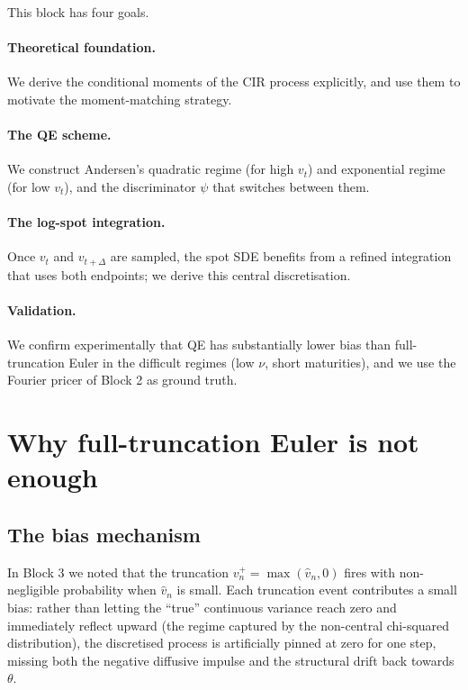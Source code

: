 \documentclass[11pt]{article}
\theoremstyle{plain}
\theoremstyle{definition}
\theoremstyle{remark}
\begin{document}
This block has four goals.

\paragraph{Theoretical foundation.} We derive the conditional moments of the CIR process explicitly, and use them to motivate the moment-matching strategy.

\paragraph{The QE scheme.} We construct Andersen's quadratic regime (for high $v_t$) and exponential regime (for low $v_t$), and the discriminator $\psi$ that switches between them.

\paragraph{The log-spot integration.} Once $v_t$ and $v_{t+\Delta}$ are sampled, the spot SDE benefits from a refined integration that uses both endpoints; we derive this central discretisation.

\paragraph{Validation.} We confirm experimentally that QE has substantially lower bias than full-truncation Euler in the difficult regimes (low $\nu$, short maturities), and we use the Fourier pricer of Block 2 as ground truth.

\section{Why full-truncation Euler is not enough}

\subsection{The bias mechanism}

In Block 3 we noted that the truncation $v_n^+ = \max(\hat v_n, 0)$ fires with non-negligible probability when $\hat v_n$ is small. Each truncation event contributes a small bias: rather than letting the ``true'' continuous variance reach zero and immediately reflect upward (the regime captured by the non-central chi-squared distribution), the discretised process is artificially pinned at zero for one step, missing both the negative diffusive impulse and the structural drift back towards $\theta$.
\end{document}
